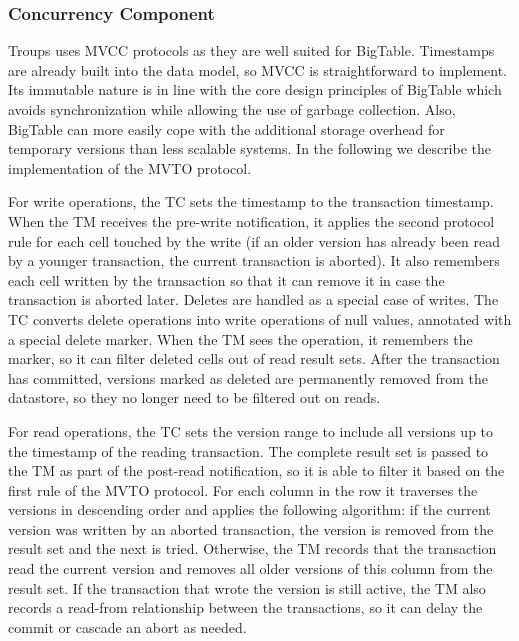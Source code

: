 \documentclass[10pt,final,journal]{IEEEtran}
\begin{document}
\subsubsection{Concurrency Component}
Troups uses MVCC protocols as they are well suited for BigTable. Timestamps are already built into the data model, so MVCC is straightforward to implement. Its immutable nature is in line with the core design principles of BigTable which avoids synchronization while allowing the use of garbage collection. Also, BigTable can more easily cope with the additional storage overhead for temporary versions than less scalable systems. In the following we describe the implementation of the MVTO protocol.

For write operations, the TC sets the timestamp to the transaction timestamp. When the TM receives the pre-write notification, it applies the second protocol rule for each cell touched by the write (if an older version has already been read by a younger transaction, the current transaction is aborted). It also remembers each cell written by the transaction so that it can remove it in case the transaction is aborted later. Deletes are handled as a special case of writes. The TC converts delete operations into write operations of null values, annotated with a special delete marker. When the TM sees the operation, it remembers the marker, so it can filter deleted cells out of read result sets. After the transaction has committed, versions marked as deleted are permanently removed from the datastore, so they no longer need to be filtered out on reads.

For read operations, the TC sets the version range to include all versions up to the timestamp of the reading transaction. The complete result set is passed to the TM as part of the post-read notification, so it is able to filter it based on the first rule of the MVTO protocol. For each column in the row it traverses the versions in descending order and applies the following algorithm: if the current version was written by an aborted transaction, the version is removed from the result set and the next is tried. Otherwise, the TM records that the transaction read the current version and removes all older versions of this column from the result set. If the transaction that wrote the version is still active, the TM also records a read-from relationship between the transactions, so it can delay the commit or cascade an abort as needed. 
\end{document}
